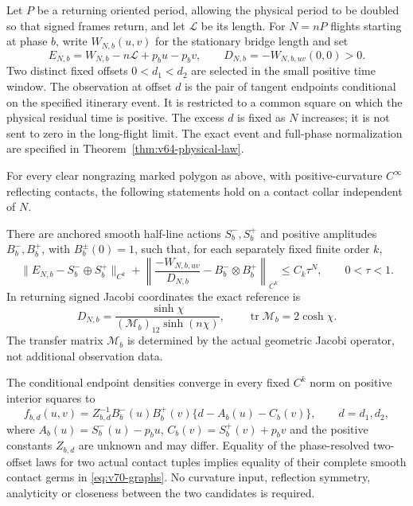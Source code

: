 Let $P$ be a returning oriented period, allowing the physical period to
be doubled so that signed frames return, and let $\mathcal L$ be its
length.  For $N=nP$ flights starting at phase $b$, write $W_{N,b}(u,v)$
for the stationary bridge length and set
\[
 E_{N,b}=W_{N,b}-n\mathcal L+p_bu-p_bv,
 \qquad D_{N,b}=-W_{N,b,uv}(0,0)>0.
\]
Two distinct fixed offsets $0<d_1<d_2$ are selected in the small positive
time window.  The observation at offset $d$ is the pair of tangent
endpoints conditional on the specified itinerary event.  It is restricted
to a common square on which the physical residual time is positive.
The excess $d$ is fixed as $N$ increases; it is not sent to zero in the
long-flight limit.  The exact event and full-phase normalization are
specified in Theorem~\ref{thm:v64-physical-law}.

\begin{theorem}
\label{thm:v70-main}
For every clear nongrazing marked polygon as above, with positive-curvature
$C^\infty$ reflecting contacts, the following statements hold on a
contact collar independent of $N$.

There are anchored smooth half-line actions $S_b^-,S_b^+$ and positive
amplitudes $B_b^-,B_b^+$, with $B_b^\pm(0)=1$, such that, for each
separately fixed finite order $k$,
\begin{equation}\label{eq:v70-relative}
 \|E_{N,b}-S_b^-\oplus S_b^+\|_{C^k}
 +\left\|\frac{-W_{N,b,uv}}{D_{N,b}}
                       -B_b^-\otimes B_b^+\right\|_{C^k}
 \le C_k\tau^N,\qquad 0<\tau<1.
\end{equation}
In returning signed Jacobi coordinates the exact reference is
\begin{equation}\label{eq:v70-reference}
 D_{N,b}=\frac{\sinh\chi}
 { (\mathcal M_b)_{12}\sinh(n\chi)},\qquad
 \operatorname{tr}\mathcal M_b=2\cosh\chi.
\end{equation}
The transfer matrix $\mathcal M_b$ is determined by the actual geometric
Jacobi operator, not additional observation data.

The conditional endpoint densities converge in every fixed $C^k$ norm
on positive interior squares to
\begin{equation}\label{eq:v70-laws}
 f_{b,d}(u,v)=Z_{b,d}^{-1}B_b^-(u)B_b^+(v)
                 \{d-A_b(u)-C_b(v)\},\qquad d=d_1,d_2,
\end{equation}
where $A_b(u)=S_b^-(u)-p_bu$, $C_b(v)=S_b^+(v)+p_bv$ and
the positive constants $Z_{b,d}$ are unknown and may differ.
Equality of the phase-resolved two-offset laws for two actual contact
tuples implies equality of their complete smooth contact germs in
\eqref{eq:v70-graphs}.  No curvature input, reflection symmetry,
analyticity or closeness between the two candidates is required.
\end{theorem}

